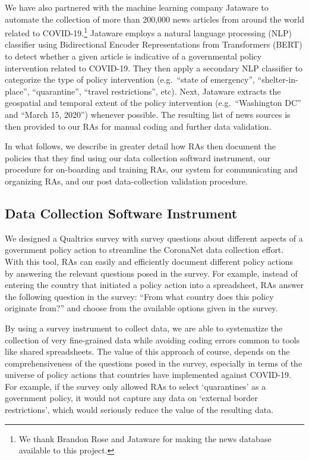 \documentclass[]{article}
\let\rmarkdownfootnote\footnote%
\def\footnote{\protect\rmarkdownfootnote}
\begin{document}
We have also partnered with the machine learning company Jataware to automate the collection of more than 200,000 news articles from around the world related to COVID-19.\footnote{We thank Brandon Rose and Jataware for making the news database available to this project.} Jataware employs a natural language processing (NLP) classifier using Bidirectional Encoder Representations from Transformers (BERT) to detect whether a given article is indicative of a governmental policy intervention related to COVID-19. They then apply a secondary NLP classifier to categorize the type of policy intervention (e.g.~``state of emergency'', ``shelter-in-place'', ``quarantine'', ``travel restrictions'', etc). Next, Jataware extracts the geospatial and temporal extent of the policy intervention (e.g.~``Washington DC'' and ``March 15, 2020'') whenever possible. The resulting list of news sources is then provided to our RAs for manual coding and further data validation.

In what follows, we describe in greater detail how RAs then document the policies that they find using our data collection softward instrument, our procedure for on-boarding and training RAs, our system for communicating and organizing RAs, and our post data-collection validation procedure.

\hypertarget{data-collection-software-instrument}{%
\subsection{Data Collection Software Instrument}\label{data-collection-software-instrument}}

We designed a Qualtrics survey with survey questions about different aspects of a government policy action to streamline the CoronaNet data collection effort. With this tool, RAs can easily and efficiently document different policy actions by answering the relevant questions posed in the survey. For example, instead of entering the country that initiated a policy action into a spreadsheet, RAs answer the following question in the survey: ``From what country does this policy originate from?'' and choose from the available options given in the survey.

By using a survey instrument to collect data, we are able to systematize the collection of very fine-grained data while avoiding coding errors common to tools like shared spreadsheets. The value of this approach of course, depends on the comprehensiveness of the questions posed in the survey, especially in terms of the universe of policy actions that countries have implemented against COVID-19. For example, if the survey only allowed RAs to select `quarantines' as a government policy, it would not capture any data on `external border restrictions', which would seriously reduce the value of the resulting data.
\end{document}
